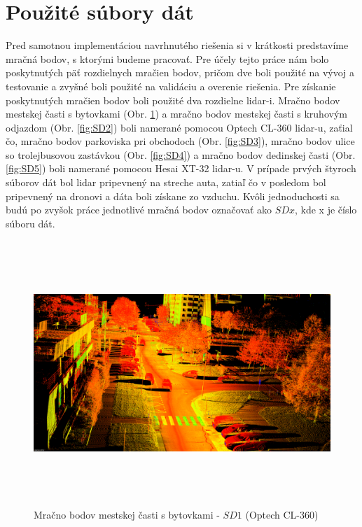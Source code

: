 \section{Použité súbory dát}
\noindent Pred samotnou implementáciou navrhnutého riešenia si v krátkosti predstavíme mračná bodov, s ktorými budeme pracovať. Pre účely tejto práce nám bolo poskytnutých päť rozdielnych mračien bodov, pričom dve boli použité na vývoj a testovanie a zvyšné boli použité na validáciu a overenie riešenia.
\newline\indent Pre získanie poskytnutých mračien bodov boli použité dva rozdielne \acrshort{lidar}-i. Mračno bodov mestskej časti s bytovkami (Obr. \ref{fig:SD1}) a mračno bodov mestskej časti s kruhovým odjazdom (Obr. \ref{fig:SD2}) boli namerané pomocou Optech CL-360 \acrshort{lidar}-u, zaťial čo, mračno bodov parkoviska pri obchodoch (Obr. \ref{fig:SD3}), mračno bodov ulice so trolejbusovou zastávkou (Obr. \ref{fig:SD4}) a mračno bodov dedinskej časti (Obr. \ref{fig:SD5}) boli namerané pomocou Hesai XT-32 \acrshort{lidar}-u. V prípade prvých štyroch súborov dát bol \acrshort{lidar} pripevnený na streche auta, zatiaľ čo v posledom bol pripevnený na dronovi a dáta boli získane zo vzduchu.
\newline\indent  Kvôli jednoduchosti sa budú po zvyšok práce jednotlivé mračná bodov označovať ako $SDx$, kde x je číslo súboru dát.

\begin{figure}[!htbp]
  \centering
  \includegraphics[width=16cm, height=10cm]{img/SD1_example.png}
  \caption{Mračno bodov mestskej časti s bytovkami - $SD1$ (Optech CL-360)} 
  \label{fig:SD1}
\end{figure} 

